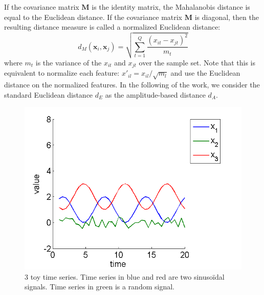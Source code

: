 If the covariance matrix $\textbf{M}$ is the identity matrix, the Mahalanobis distance is equal to the Euclidean distance. If the covariance matrix $\textbf{M}$ is diagonal, then the resulting distance measure is called a normalized Euclidean distance:
\begin{equation}	
d_M(\textbf{x}_i,\textbf{x}_j) = \sqrt{\sum\limits_{t=1}^{Q}\frac{(x_{it}-x_{jt})^2}{m_t}}
\label{eq:dM2}
\end{equation}
\noindent where $m_t$ is the variance of the $x_{it}$ and $x_{jt}$ over the sample set. Note that this is equivalent to normalize each feature: $x'_{il} = x_{il}/\sqrt{m_l}$ and use the Euclidean distance on the normalized features.
In the following of the work, we consider the standard Euclidean distance $d_E$ as the amplitude-based distance $d_A$.

\begin{figure}[h!]
\centering
\includegraphics[width=0.6\linewidth]{images/ExampleTimeSeriesMetrics3}
\caption{3 toy time series. Time series in blue and red are two sinusoïdal signals. Time series in green is a random signal.}
\label{fig:ExampleTimeSeriesMetrics3}
\end{figure}

